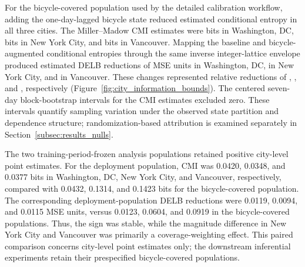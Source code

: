 For the bicycle-covered population used by the detailed calibration
workflow, adding the one-day-lagged bicycle state reduced estimated
conditional entropy in all three cities. The Miller--Madow CMI
estimates were \DCCMI{} bits in Washington, DC, \NYCMI{} bits in New York City,
and \VANCMI{} bits in Vancouver.
Mapping the baseline and bicycle-augmented conditional entropies through the
same inverse integer-lattice envelope produced estimated DELB reductions of
\DCDeltaL{} MSE units in Washington, DC, \NYDeltaL{} in New York City, and
\VANDeltaL{} in Vancouver. These changes represented relative reductions of
\DCRelativeL, \NYRelativeL, and \VANRelativeL, respectively
(Figure~\ref{fig:city_information_bounds}).
The centered seven-day block-bootstrap intervals for the CMI estimates
excluded zero. These intervals quantify sampling variation under the
observed state partition and dependence structure; randomization-based
attribution is examined separately in Section~\ref{subsec:results_nulls}.

The two training-period-frozen analysis populations retained
positive city-level point estimates.
For the deployment population, CMI was 0.0420, 0.0348, and 0.0377 bits in
Washington, DC, New York City, and Vancouver, respectively, compared with
0.0432, 0.1314, and 0.1423 bits for the bicycle-covered population. The
corresponding deployment-population DELB reductions were 0.0119, 0.0094, and
0.0115 MSE units, versus 0.0123, 0.0604, and 0.0919 in the bicycle-covered
populations. 
Thus, the sign was stable, while
the magnitude difference in New York City and Vancouver was primarily a
coverage-weighting effect. This paired comparison concerns city-level point
estimates only; the downstream
inferential experiments retain their prespecified bicycle-covered
populations.

